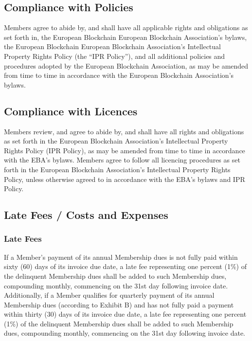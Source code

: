 \documentclass{article}
\begin{document}
\subsection{Compliance with Policies}

Members agree to abide by, and shall have all applicable rights and obligations as set forth in, the European Blockchain European Blockchain Association’s bylaws, the European Blockchain European Blockchain Association’s Intellectual Property Rights Policy (the “IPR Policy”), and all additional policies and procedures adopted by the European Blockchain Association, as may be amended from time to time in accordance with the European Blockchain Association’s bylaws.

\subsection{Compliance with Licences}

Members review, and agree to abide by, and shall have all rights and obligations as set forth in the European Blockchain Association’s Intellectual Property Rights Policy (IPR Policy), as may be amended from time to time in accordance with the EBA’s bylaws. 
Members agree to follow all licencing procedures as set forth in the European Blockchain Association’s Intellectual Property Rights Policy, unless otherwise agreed to in accordance with the EBA’s bylaws and IPR Policy.

\subsection{Late Fees / Costs and Expenses}

\subsubsection{Late Fees}

If a Member’s payment of its annual Membership dues is not fully paid within sixty (60) days of its invoice due date, a late fee representing one percent (1\%) of the delinquent Membership dues shall be added to such Membership dues, compounding monthly, commencing on the 31st day following invoice date.
 Additionally, if a Member qualifies for quarterly payment of its annual Membership dues (according to Exhibit B) and has not fully paid a payment within thirty (30) days of its invoice due date, a late fee representing one percent (1\%) of the delinquent Membership dues shall be added to such Membership dues, compounding monthly, commencing on the 31st day following invoice date.
\end{document}
